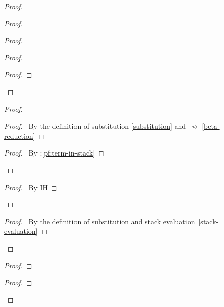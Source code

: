\documentclass[a4paper]{article}
\begin{document}
\begin{proof}
\begin{proof}
\begin{proof}
\begin{proof}
\begin{proof}
        \end{proof}
      \end{proof}
      \begin{proof}
        \begin{proof}
          \pf\ By the definition of substitution \ref{substitution} and $\rightsquigarrow$ \ref{beta-reduction}
        \end{proof}
        \qedstep
        \begin{proof}
          \pf\ By \toplevel:\ref{pf:term-in-stack}
        \end{proof}
      \end{proof}
      \qedstep
      \begin{proof}
        \pf\ By IH
      \end{proof}
    \end{proof}
    \begin{proof}
      \pf\ By the definition of substitution and stack evaluation~\ref{stack-evaluation}
    \end{proof}
  \end{proof}
  \begin{proof}
  \end{proof}
  \begin{proof}

\end{proof}
\end{proof}
\end{document}
